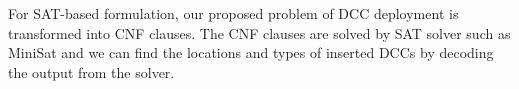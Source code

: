 \begin{comment}
Consider the other example in Figure~\ref{fig:sub:lower}, where the 80\% and 20\% DCCs are inserted at the inputs of buffer 4 and 5, respectively. Assume again that the critical path $p$ is in shortlist. If the DCC deployment will lead the path $p$ to fail post-maturely (i.e., path fail within $[ n + \varepsilon, \infty]$), then the following clause
\begin{gather*}
	\fontsize{9}{7} \selectfont
	\mbox{($A_{1} \lor A_{0} \lor B_{1} \lor B_{0} \lor C_{1} \lor \neg C_{0}$) } 
\end{gather*}
will be generated and added into CNF, such that the solver will not output the corresponding DCC deployment in the result if the CNF is satisfiable.
\end{comment}
For SAT-based formulation, our proposed problem of DCC deployment is transformed into CNF clauses. The CNF clauses are solved by SAT solver such as MiniSat and we can find the locations and types of inserted DCCs by decoding the output from the solver.



